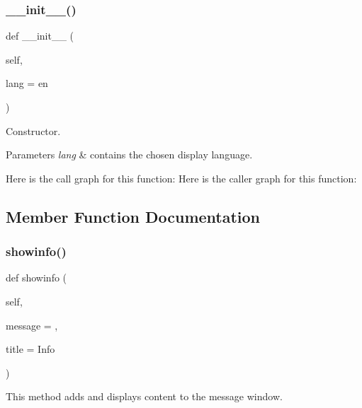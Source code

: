 \subsubsection{\texorpdfstring{\+\_\+\+\_\+init\+\_\+\+\_\+()}{\_\_init\_\_()}}
{\footnotesize\ttfamily def \+\_\+\+\_\+init\+\_\+\+\_\+ (\begin{DoxyParamCaption}\item[{}]{self,  }\item[{}]{lang = {\ttfamily \textquotesingle{}en\textquotesingle{}} }\end{DoxyParamCaption})}



Constructor. 


\begin{DoxyParams}{Parameters}
{\em lang} & contains the chosen display language. \\
\hline
\end{DoxyParams}
Here is the call graph for this function\+:
Here is the caller graph for this function\+:


\subsection{Member Function Documentation}
\mbox{\label{classbackpack_1_1src_1_1gui_1_1window_1_1messageWindow_ac363d9b210b00523bd2d7b73e5f1a2dd}} 
\subsubsection{\texorpdfstring{showinfo()}{showinfo()}}
{\footnotesize\ttfamily def showinfo (\begin{DoxyParamCaption}\item[{}]{self,  }\item[{}]{message = {\ttfamily \textquotesingle{}\textquotesingle{}},  }\item[{}]{title = {\ttfamily \textquotesingle{}Info\textquotesingle{}} }\end{DoxyParamCaption})}



This method adds and displays content to the message window. 


